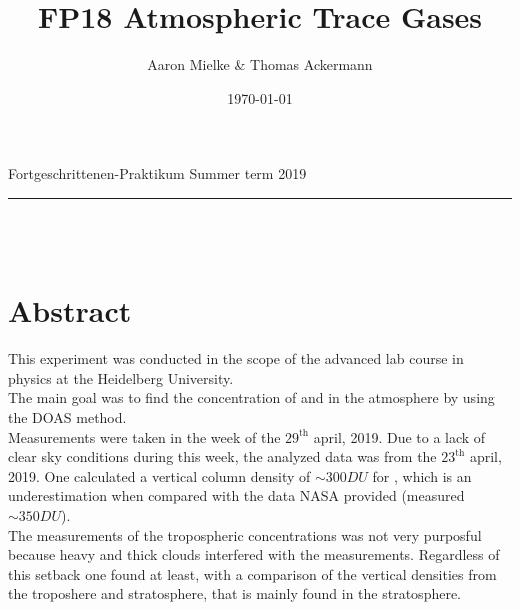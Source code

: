 \documentclass[12pt, a4paper, bibliography=totoc]{scrartcl}
\title{FP18 Atmospheric Trace Gases}
\author{Aaron Mielke \& Thomas Ackermann}
\date{\today}
\begin{document}
\begin{center}
	\makeatletter
	\thispagestyle{empty}
	\large{Fortgeschrittenen-Praktikum}	
	\hfill
    \large{Summer term 2019}
    \vspace{5mm}
	\rule{\textwidth}{0.2pt}
    \vfill
	\Huge\textbf{\@title} \\
	\vspace{10mm}
	\large{\@author} \\
	\normalfont
	\vfill	
	\makeatother
\end{center}

\normalsize
\newpage

\section*{Abstract}

This experiment was conducted in the scope of the advanced lab course in physics at the Heidelberg University. \\
The main goal was to find the concentration of  and  in the atmosphere by using the DOAS method. \\
Measurements were taken in the week of the $29^\text{th}$ april, 2019.
Due to a lack of clear sky conditions during this week, the analyzed data was from the $23^\text{th}$ april, 2019. 
One calculated a vertical column density of $\sim 300 \si{DU}$ for , which is an underestimation when compared with the data NASA provided (measured $\sim 350 \si{DU}$).\\ 
The measurements of the tropospheric concentrations was not very purposful because heavy and thick clouds interfered with the measurements. 
Regardless of this setback one found at least, with a comparison of the vertical densities from the troposhere and stratosphere, that  is mainly found in the stratosphere. 

\newpage

\tableofcontents
\newpage
\end{document}
